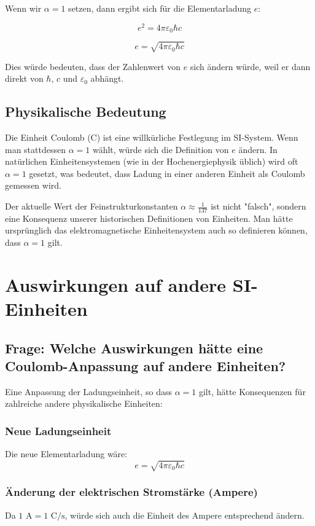 \documentclass{article}
\begin{document}
	Wenn wir $\alpha = 1$ setzen, dann ergibt sich für die Elementarladung $e$:
	
	$$e^2 = 4\pi\varepsilon_0\hbar c$$
	
	$$e = \sqrt{4\pi\varepsilon_0\hbar c}$$
	
	Dies würde bedeuten, dass der Zahlenwert von $e$ sich ändern würde, weil er dann direkt von $\hbar$, $c$ und $\varepsilon_0$ abhängt.
	
	\subsection{Physikalische Bedeutung}
	
	Die Einheit Coulomb (C) ist eine willkürliche Festlegung im SI-System. Wenn man stattdessen $\alpha = 1$ wählt, würde sich die Definition von $e$ ändern. In natürlichen Einheitensystemen (wie in der Hochenergiephysik üblich) wird oft $\alpha = 1$ gesetzt, was bedeutet, dass Ladung in einer anderen Einheit als Coulomb gemessen wird.
	
	Der aktuelle Wert der Feinstrukturkonstanten $\alpha \approx \frac{1}{137}$ ist nicht "falsch", sondern eine Konsequenz unserer historischen Definitionen von Einheiten. Man hätte ursprünglich das elektromagnetische Einheitensystem auch so definieren können, dass $\alpha = 1$ gilt.
	
	\section{Auswirkungen auf andere SI-Einheiten}
	
	\subsection{Frage: Welche Auswirkungen hätte eine Coulomb-Anpassung auf andere Einheiten?}
	
	Eine Anpassung der Ladungseinheit, so dass $\alpha = 1$ gilt, hätte Konsequenzen für zahlreiche andere physikalische Einheiten:
	
	\subsubsection{Neue Ladungseinheit}
	Die neue Elementarladung wäre:
	$$e = \sqrt{4\pi\varepsilon_0\hbar c}$$
	
	\subsubsection{Änderung der elektrischen Stromstärke (Ampere)}
	Da $1 \text{ A} = 1 \text{ C}/\text{s}$, würde sich auch die Einheit des Ampere entsprechend ändern.
	
\end{document}
